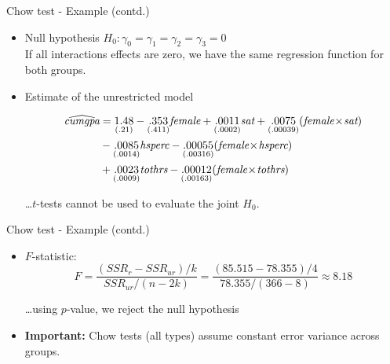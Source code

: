 \documentclass{beamer}
\begin{document}
\begin{frame}{Chow test - Example (contd.) }
\begin{itemize}
\item Null hypothesis
\vspace{0.3cm}
$H_0 : \gamma_0 = \gamma_1 = \gamma_2 = \gamma_3 = 0$ \\
If all interactions effects are zero, we have the same regression function for both groups.
\vspace{0.3cm}
\item Estimate of the unrestricted model

\begin{equation} \notag 
\begin{aligned}
\widehat{\textit{cumgpa}} &= \underset{(.21)}{1.48} - \underset{(.411)}{.353} \textit{female} + \underset{(.0002)}{.0011} \textit{sat} + \underset{(.00039)}{.0075}(\textit{female} \! \times \! \textit{sat} ) 
\\&- \underset{(.0014)}{.0085} \textit{hsperc} - \underset{(.00316)}{.00055} (\textit{female} \! \times \! \textit{hsperc} ) 
\\&+  \underset{(.0009)}{.0023} \textit{tothrs} - \underset{(.00163)}{.00012} (\textit{female} \! \times \! \textit{tothrs} )
\end{aligned}
\end{equation}

\dots $t$-tests cannot be used to evaluate the joint $H_0$. 
\end{itemize}
\end{frame}


\begin{frame}{Chow test - Example (contd.)}
\begin{itemize}
\item $F$-statistic:
$$F= \frac{(\textit{SSR}_r - \textit{SSR}_{\textit{ur}})/k}{\textit{SSR}_{\textit{ur}}/(n-2k)}=\frac{(85.515 - 78.355)/4}{78.355/(366-8)}\approx8.18$$

\dots using $p$-value, we reject the null hypothesis \\
\vspace{3cm}
\item \textbf{Important:} Chow tests (all types) assume constant error variance across groups.

\end{itemize}
\end{frame}
\end{document}
